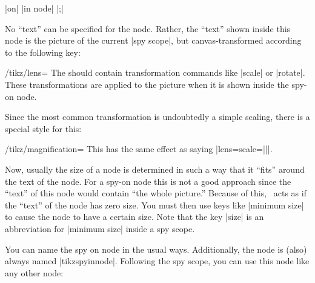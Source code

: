 \begin{command}{\spy {} |on| 
    |in node| |;|}
\begin{enumerate}
\begin{codeexample}[]
\end{codeexample}    
    No ``text'' can be specified for the node. Rather, the ``text''
    shown inside this node is the picture of the current |spy scope|,
    but canvas-transformed according to the following key:
    \begin{key}{/tikz/lens=}
      The  should contain transformation commands like
      |scale| or |rotate|. These transformations are applied to the
      picture when it is shown inside the spy-on node.
    \end{key}
    Since the most common transformation is undoubtedly a simple
    scaling, there is a special style for this:
    \begin{key}{/tikz/magnification=}
      This has the same effect as saying
      |lens={scale=||}|. 
    \end{key}
    Now, usually the size of a node is determined in such a way that
    it ``fits'' around the text of the node. For a spy-on node this is
    not a good approach since the ``text'' of this node would contain
    ``the whole picture.'' Because of this, \tikzname\ acts
    as if the ``text'' of the node has zero size. You must then use
    keys like |minimum size| to cause the node to have a certain
    size. Note that the key |size| is an abbreviation for
    |minimum size| inside a spy scope.

    You can name the spy on node in the usual ways. Additionally, the
    node is (also) always named |tikzspyinnode|. Following the spy
    scope, you can use this node like any other node:    
\begin{codeexample}[]
\end{codeexample}


\end{enumerate}
\end{command}

